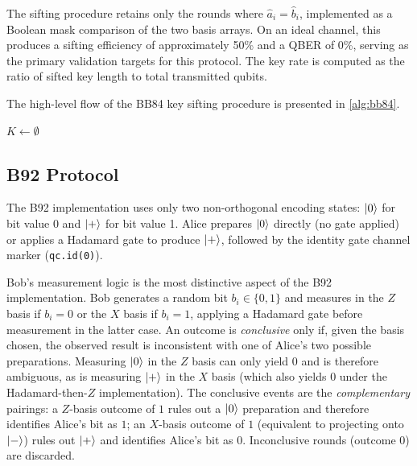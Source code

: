 \documentclass[10pt, a4paper]{report}
\begin{document}
The sifting procedure retains only the rounds where $\hat{a}_i = \hat{b}_i$, implemented as a Boolean mask comparison of the two basis arrays. On an ideal channel, this produces a sifting efficiency of approximately 50\% and a QBER of 0\%, serving as the primary validation targets for this protocol. The key rate is computed as the ratio of sifted key length to total transmitted qubits.


The high-level flow of the BB84 key sifting procedure is presented in \cref{alg:bb84}.

\begin{algorithm}[H]
    \caption{BB84 Key Sifting Procedure}\label{alg:bb84}
    $K \leftarrow \emptyset$\;
\end{algorithm}


\subsection{B92 Protocol}

The B92 implementation uses only two non-orthogonal encoding states: $\ket{0}$ for bit value 0 and $\ket{+}$ for bit value 1. Alice prepares $\ket{0}$ directly (no gate applied) or applies a Hadamard gate to produce $\ket{+}$, followed by the identity gate channel marker (\texttt{qc.id(0)}).

Bob's measurement logic is the most distinctive aspect of the B92 implementation. Bob generates a random bit $b_i \in \{0, 1\}$ and measures in the $Z$ basis if $b_i = 0$ or the $X$ basis if $b_i = 1$, applying a Hadamard gate before measurement in the latter case. An outcome is \textit{conclusive} only if, given the basis chosen, the observed result is inconsistent with one of Alice's two possible preparations. Measuring $\ket{0}$ in the $Z$ basis can only yield $0$ and is therefore ambiguous, as is measuring $\ket{+}$ in the $X$ basis (which also yields $0$ under the Hadamard-then-$Z$ implementation). The conclusive events are the \emph{complementary} pairings: a $Z$-basis outcome of $1$ rules out a $\ket{0}$ preparation and therefore identifies Alice's bit as $1$; an $X$-basis outcome of $1$ (equivalent to projecting onto $\ket{-}$) rules out $\ket{+}$ and identifies Alice's bit as $0$. Inconclusive rounds (outcome $0$) are discarded.
\end{document}
